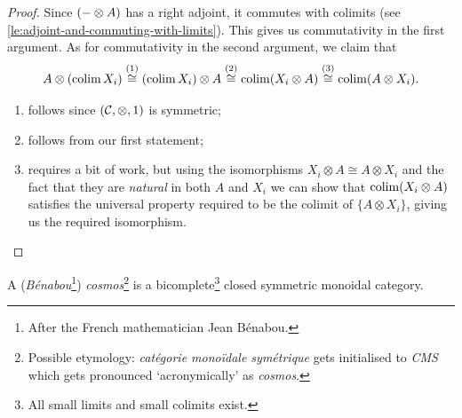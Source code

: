 \begin{proof}

            Since $({-}\otimes A)$ has a right adjoint, it commutes with colimits (see \cref{le:adjoint-and-commuting-with-limits}).
            This gives us commutativity in the first argument.
            As for commutativity in the second argument, we claim that
            \begin{equation*}
                A\otimes(\operatorname{colim} X_i) \overset{(1)}{\cong} (\operatorname{colim} X_i)\otimes A \overset{(2)}{\cong} \operatorname{colim}(X_i\otimes A) \overset{(3)}{\cong} \operatorname{colim}(A\otimes X_i).
            \end{equation*}
            \begin{enumerate}[(1)]
                \item follows since $(\mathcal{C},\otimes,1)$ is symmetric;
                \item follows from our first statement;
                \item requires a bit of work, but using the isomorphisms $X_i\otimes A\cong A\otimes X_i$ and the fact that they are \emph{natural} in both $A$ and $X_i$ we can show that $\operatorname{colim}(X_i\otimes A)$ satisfies the universal property required to be the colimit of $\{A\otimes X_i\}$, giving us the required isomorphism.\qedhere
            \end{enumerate}
        \end{proof}

        \begin{definition}[Cosmos]\label{df:cosmos}
            A (\emph{Bénabou}\footnote{
                After the French mathematician Jean Bénabou.
            }) \emph{cosmos}\footnote{
                Possible etymology: \emph{catégorie monoïdale symétrique} gets initialised to \emph{CMS} which gets pronounced `acronymically' as \emph{cosmos}.
            } is a bicomplete\footnote{
                All small limits and small colimits exist.
            } closed symmetric monoidal category.
        \end{definition}

